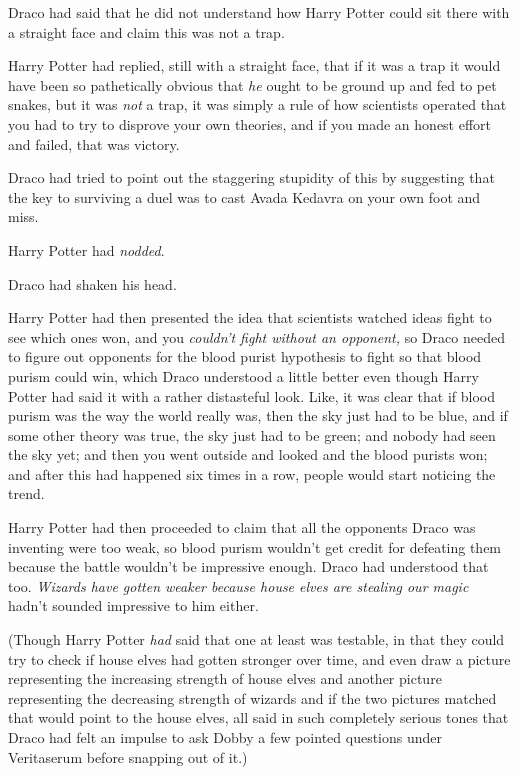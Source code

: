 Draco had said that he did not understand how Harry Potter could sit there with 
a straight face and claim this was not a trap.

Harry Potter had replied, still with a straight face, that if it was a trap it 
would have been so pathetically obvious that \emph{he} ought to be ground up 
and fed to pet snakes, but it was \emph{not} a trap, it was simply a rule of 
how scientists operated that you had to try to disprove your own theories, and 
if you made an honest effort and failed, that was victory.

Draco had tried to point out the staggering stupidity of this by suggesting 
that the key to surviving a duel was to cast Avada Kedavra on your own foot and 
miss.

Harry Potter had \emph{nodded}.

Draco had shaken his head.

Harry Potter had then presented the idea that scientists watched ideas fight to 
see which ones won, and you \emph{couldn't fight without an opponent,} so Draco 
needed to figure out opponents for the blood purist hypothesis to fight so that 
blood purism could win, which Draco understood a little better even though 
Harry Potter had said it with a rather distasteful look. Like, it was clear 
that if blood purism was the way the world really was, then the sky just had to 
be blue, and if some other theory was true, the sky just had to be green; and 
nobody had seen the sky yet; and then you went outside and looked and the blood 
purists won; and after this had happened six times in a row, people would start 
noticing the trend.

Harry Potter had then proceeded to claim that all the opponents Draco was 
inventing were too weak, so blood purism wouldn't get credit for defeating them 
because the battle wouldn't be impressive enough. Draco had understood that 
too. \emph{Wizards have gotten weaker because house elves are stealing our 
magic} hadn't sounded impressive to him either.

(Though Harry Potter \emph{had} said that one at least was testable, in that 
they could try to check if house elves had gotten stronger over time, and even 
draw a picture representing the increasing strength of house elves and another 
picture representing the decreasing strength of wizards and if the two pictures 
matched that would point to the house elves, all said in such completely 
serious tones that Draco had felt an impulse to ask Dobby a few pointed 
questions under Veritaserum before snapping out of it.)

